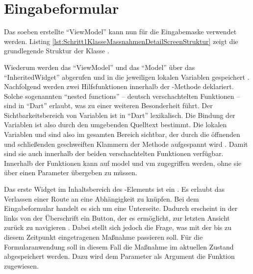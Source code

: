 

\section{Eingabeformular}
  
Das soeben erstellte \enquote{ViewModel} kann nun für die Eingabemaske verwendet werden.
Listing \ref{lst:Schritt1KlasseMassnahmenDetailScreenStruktur} zeigt die grundlegende Struktur der Klasse .

    
Wiederum werden das \enquote{ViewModel} und das \enquote{Model} über das \enquote{InheritedWidget}  abgerufen und in die jeweiligen lokalen Variablen gespeichert .
Nachfolgend werden zwei Hilfsfunktionen innerhalb der -Methode deklariert.
Solche sogenannten \enquote{nested functions} -- deutsch
verschachtelten Funktionen -- sind in \enquote{Dart} erlaubt, was zu einer weiteren Besonderheit führt.
Der Sichtbarkeitsbereich von Variablen ist in \enquote{Dart} lexikalisch.
Die Bindung der Variablen ist also durch den umgebenden Quelltext bestimmt.
Die lokalen Variablen  und  sind also im gesamten Bereich sichtbar, der durch die öffnenden und schließenden geschweiften Klammern der Methode  aufgespannt wird .
Damit sind sie auch innerhalb der beiden verschachtelten Funktionen verfügbar.
Innerhalb der Funktionen kann auf model und vm zugegriffen werden, ohne sie über einen Parameter übergeben zu müssen.


Das erste Widget im Inhaltsbereich des -Elements ist ein .
Es erlaubt das Verlassen einer Route an eine Abhängigkeit zu knüpfen.
Bei dem Eingabeformular handelt es sich um eine Unterseite.
Dadurch erscheint in der   links von der Überschrift ein Button, der es ermöglicht, zur letzten Ansicht zurück zu navigieren \Abb{\ref{fig:Schritt1Eingabemaske}}.
Dabei stellt sich jedoch die Frage, was mit der bis zu diesem Zeitpunkt eingetragenen Maßnahme passieren soll.
Für die Formularanwendung soll in diesem Fall die Maßnahme im aktuellen Zustand abgespeichert werden.
Dazu wird dem Parameter  als Argument die Funktion  zugewiesen.



